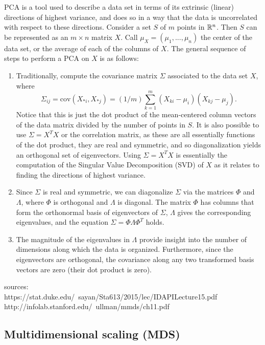 \documentclass{gtpart}
\theoremstyle{definition}
\begin{document}
PCA is a tool used to describe a data set in terms of its extrinsic (linear) directions of highest variance, and does so in a way that the data is uncorrelated with respect to these directions. Consider a set $S$ of $m$ points in $\mathbb{R}^n$. Then $S$ can be represented as an $m \times n$ matrix $X$. Call $\mu_X = (\mu_1, ..., \mu_n)$ the center of the data set, or the average of each of the columns of $X$. The general sequence of steps to perform a PCA on $X$ is as follows:
\begin{enumerate}[(1)]
\item Traditionally, compute the covariance matrix $\Sigma$ associated to the data set $X$, where $$\Sigma_{ij} = \text{cov}(X_{*i}, X_{*j}) =(1/m) \sum_{k=1}^m (X_{ki} - \mu_i)(X_{kj} - \mu_j).$$ Notice that this is just the dot product of the mean-centered column vectors of the data matrix divided by the number of points in $S$. It is also possible to use $\Sigma = X^TX$ or the correlation matrix, as these are all essentially functions of the dot product, they are real and symmetric, and so diagonalization yields an orthogonal set of eigenvectors. Using $\Sigma = X^TX$ is essentially the computation of the Singular Value Decomposition (SVD) of $X$ as it relates to finding the directions of highest variance.
\item Since $\Sigma$ is real and symmetric, we can diagonalize $\Sigma$ via the matrices $\Phi$ and $\Lambda$, where $\Phi$ is orthogonal and $\Lambda$ is diagonal. The matrix $\Phi$ has columns that form the orthonormal basis of eigenvectors of $\Sigma$, $\Lambda$ gives the corresponding eigenvalues, and the equation $\Sigma = \Phi \Lambda \Phi^T$ holds.
\item The magnitude of the eigenvalues in $\Lambda$ provide insight into the number of dimensions along which the data is organized. Furthermore, since the eigenvectors are orthogonal, the covariance along any two transformed basis vectors are zero (their dot product is zero).
\end{enumerate}

sources:  \\
https://stat.duke.edu/~sayan/Sta613/2015/lec/IDAPILecture15.pdf \\
http://infolab.stanford.edu/~ullman/mmds/ch11.pdf \\

\subsection{Multidimensional scaling (MDS)}
\end{document}
